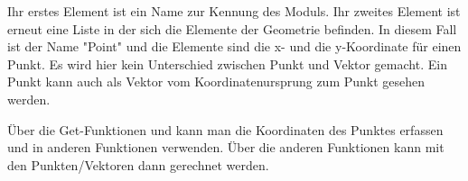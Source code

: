 \medskip

\MapleCommand{[MVPOINT, [x,y]]}

\medskip

Ihr erstes Element ist ein Name zur Kennung des Moduls. Ihr zweites Element ist erneut eine Liste in der sich die Elemente der Geometrie befinden. In diesem Fall ist der Name "Point" und die Elemente sind die x- und die y-Koordinate für einen Punkt. Es wird hier kein Unterschied zwischen Punkt und Vektor gemacht. Ein Punkt kann auch als Vektor vom Koordinatenursprung zum Punkt gesehen werden. 

Über die Get-Funktionen  und  kann man die Koordinaten des Punktes erfassen und in anderen Funktionen verwenden. Über die anderen Funktionen kann mit den Punkten/Vektoren dann gerechnet werden.

\bigskip

